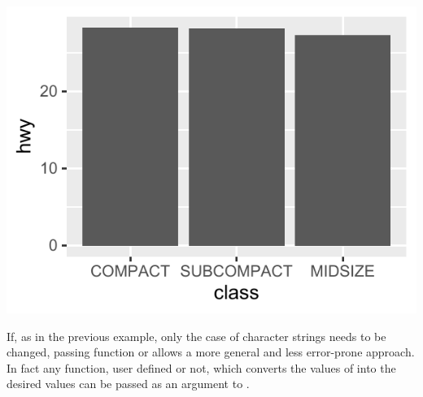 \documentclass[krantz2]{krantz}\usepackage{knitr}
\begin{document}
\begin{knitrout}\footnotesize
{}\color{fgcolor}\begin{kframe}
\begin{alltt}
  \hlopt{+}
  \hlstd{(} \hlstd{=} \hlstd{,}    \hlstd{=} \hlstd{)} \hlopt{+}
  \hlstd{(} \hlstd{=} \hlstd{(}\hlstd{,} \hlstd{,} \hlstd{),}
                    \hlstd{=} \hlstd{(}\hlstd{,} \hlstd{,} \hlstd{))}
\end{alltt}
\end{kframe}

{\centering \includegraphics[width=.54\textwidth]{figure/pos-scale-discrete-10-1} 

}


\end{knitrout}

If, as in the previous example, only the case of character strings needs to be changed, passing function  or  allows a more general and less error-prone approach. In fact any function, user defined or not, which converts the values of  into the desired values can be passed as an argument to .

\begin{knitrout}\footnotesize
{}\color{fgcolor}\begin{kframe}
\begin{alltt}
  \hlstd{(} \hlstd{=} \hlstd{(}\hlstd{,} \hlstd{,} \hlstd{),}
                    
\end{alltt}
\end{kframe}
\end{knitrout}
\end{document}
